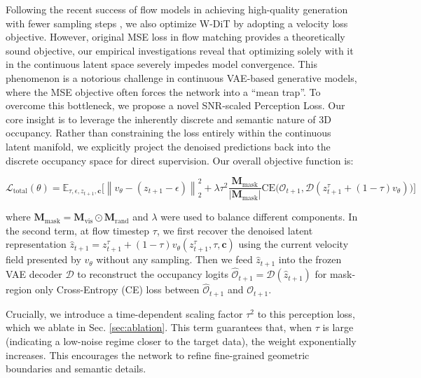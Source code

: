 Following the recent success of flow models in achieving high-quality generation with fewer sampling steps \cite{liu2025towards, song2025hume, zhang2025epona}, we also optimize W-DiT by adopting a velocity loss objective. However, original MSE loss in flow matching provides a theoretically sound objective, our empirical investigations reveal that optimizing solely with it in the continuous latent space severely impedes model convergence. This phenomenon is a notorious challenge in continuous VAE-based generative models, where the MSE objective often forces the network into a ``mean trap''. To overcome this bottleneck, we propose a novel SNR-scaled Perception Loss. Our core insight is to leverage the inherently discrete and semantic nature of 3D occupancy. Rather than constraining the loss entirely within the continuous latent manifold, we explicitly project the denoised predictions back into the discrete occupancy space for direct supervision. Our overall objective function is:

\begin{equation}
 \mathcal{L}_{\mathrm{total}}(\theta) = \mathbb{E}_{\tau, \epsilon, z_{t+1}, \mathbf{c}} \bigg[ \left\| v_\theta - (z_{t+1} - \epsilon) \right\|_2^2 + \lambda \tau^2\frac{\mathbf{M}_{\mathrm{mask}}}{|\mathbf{M}_{\mathrm{mask}}|}\mathrm{CE}\bigg(\mathcal{O}_{t+1}, \mathcal{D}(z_{t+1}^{\tau} + (1-\tau)v_\theta)\bigg) \bigg]
\label{eq:total_loss}
\end{equation}

where $\mathbf{M}_{\mathrm{mask}} = \mathbf{M}_{\text{vis}} \odot \mathbf{M}_{\text{rand}}$ and $\lambda$ were used to balance different components. In the second term, at flow timestep $\tau$, we first recover the denoised latent representation $\hat{z}_{t+1}=z_{t+1}^{\tau} + (1-\tau)v_\theta(z_{t+1}^{\tau}, \tau, \mathbf{c})$ using the current velocity field presented by $v_\theta$ without any sampling. Then we feed $\hat{z}_{t+1}$ into the frozen VAE decoder $\mathcal{D}$ to reconstruct the occupancy logits $\hat{\mathcal{O}}_{t+1} = \mathcal{D}(\hat{z}_{t+1})$ for mask-region only Cross-Entropy (CE) loss between $\hat{\mathcal{O}}_{t+1}$ and $\mathcal{O}_{t+1}$.

Crucially, we introduce a time-dependent scaling factor $\tau^2$ to this perception loss, which we ablate in Sec. \ref{sec:ablation}. This term guarantees that, when $\tau$ is large (indicating a low-noise regime closer to the target data), the weight exponentially increases. This encourages the network to refine fine-grained geometric boundaries and semantic details. 

